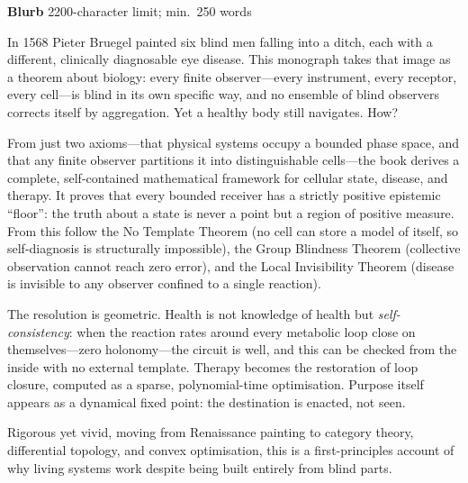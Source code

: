 \documentclass[11pt,a4paper]{article}
\newcommand{\field}[3]{%
  \par\medskip
  {\color{labelcol}\bfseries\large #1}%
  \hfill{\color{limitcol}\small #2}\par
  \vspace{2pt}%
  \noindent\colorbox{fieldbg}{%
    \begin{minipage}{\dimexpr\linewidth-2\fboxsep\relax}
    \vspace{2pt}#3\vspace{2pt}
    \end{minipage}}%
  \par
}
\newcommand{\charcount}[2]{{\color{limitcol}\small\itshape [#1 characters / #2 limit]}}
\newcommand{\wordcount}[1]{{\color{limitcol}\small\itshape [#1 words]}}
\begin{document}
\field{Blurb}{2200-character limit; min.\ 250 words}{%
In 1568 Pieter Bruegel painted six blind men falling into a ditch, each with a
different, clinically diagnosable eye disease. This monograph takes that image
as a theorem about biology: every finite observer---every instrument, every
receptor, every cell---is blind in its own specific way, and no ensemble of
blind observers corrects itself by aggregation. Yet a healthy body still
navigates. How?

From just two axioms---that physical systems occupy a bounded phase space, and
that any finite observer partitions it into distinguishable cells---the book
derives a complete, self-contained mathematical framework for cellular state,
disease, and therapy. It proves that every bounded receiver has a strictly
positive epistemic ``floor'': the truth about a state is never a point but a
region of positive measure. From this follow the No Template Theorem (no cell
can store a model of itself, so self-diagnosis is structurally impossible), the
Group Blindness Theorem (collective observation cannot reach zero error), and
the Local Invisibility Theorem (disease is invisible to any observer confined
to a single reaction).

The resolution is geometric. Health is not knowledge of health but
\emph{self-consistency}: when the reaction rates around every metabolic loop
close on themselves---zero holonomy---the circuit is well, and this can be
checked from the inside with no external template. Therapy becomes the
restoration of loop closure, computed as a sparse, polynomial-time
optimisation. Purpose itself appears as a dynamical fixed point: the
destination is enacted, not seen.

Rigorous yet vivid, moving from Renaissance painting to category theory,
differential topology, and convex optimisation, this is a first-principles
account of why living systems work despite being built entirely from blind
parts.
  \par\vspace{4pt}\charcount{1799}{2200}\quad\wordcount{266}
}
\end{document}
